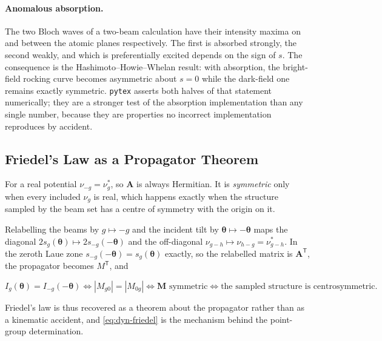 \paragraph{Anomalous absorption.} The two Bloch waves of a two-beam calculation have their
intensity maxima on and between the atomic planes respectively. The first is absorbed
strongly, the second weakly, and which is preferentially excited depends on the sign of
\(s\). The consequence is the Hashimoto--Howie--Whelan result: with absorption, the
bright-field rocking curve becomes asymmetric about \(s = 0\) while the dark-field one
remains exactly symmetric. \texttt{pytex} asserts both halves of that statement numerically;
they are a stronger test of the absorption implementation than any single number, because
they are properties no incorrect implementation reproduces by accident.

\subsection{Friedel's Law as a Propagator Theorem}

For a real potential \(\nu_{-g} = \nu_{g}^{*}\), so \(\mathbf{A}\) is always Hermitian. It is
\emph{symmetric} only when every included \(\nu_{g}\) is real, which happens exactly when the
structure sampled by the beam set has a centre of symmetry with the origin on it.

Relabelling the beams by \(g \mapsto -g\) and the incident tilt by \(\boldsymbol{\theta}
\mapsto -\boldsymbol{\theta}\) maps the diagonal \(2s_{g}(\boldsymbol{\theta}) \mapsto
2s_{-g}(-\boldsymbol{\theta})\) and the off-diagonal \(\nu_{g-h} \mapsto \nu_{h-g} =
\nu_{g-h}^{*}\). In the zeroth Laue zone \(s_{-g}(-\boldsymbol{\theta}) =
s_{g}(\boldsymbol{\theta})\) exactly, so the relabelled matrix is
\(\mathbf{A}^{\mathsf{T}}\), the propagator becomes \(M^{\mathsf{T}}\), and

\begin{equation}
  I_{g}(\boldsymbol{\theta}) = I_{-g}(-\boldsymbol{\theta})
  \iff |M_{g0}| = |M_{0g}|
  \iff \mathbf{M} \text{ symmetric}
  \iff \text{the sampled structure is centrosymmetric.}
  \label{eq:dyn-friedel}
\end{equation}

Friedel's law is thus recovered as a theorem about the propagator rather than as a kinematic
accident, and \eqref{eq:dyn-friedel} is the mechanism behind the point-group determination.

